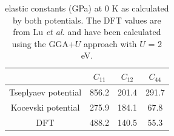 \documentclass[preprint, 12pt]{elsarticle}
\begin{document}
\begin{table}[h!]
    \centering
    \caption{ elastic constants (GPa) at 0 K as calculated by both potentials. The DFT values are from Lu \textit{et al.} \cite{Lu2011} and have been calculated using the GGA+$U$ approach with $U$ = 2 eV.}
    \footnotesize
    \begin{tabular}{c|ccc}
    \hline
                             & $C_{11}$ & $C_{12}$ & $C_{44}$ \\
    \hline          
    Tseplyaev potential    & 856.2    & 201.4    & 291.7    \\
    Kocevski potential     & 275.9    & 184.1    & 67.8     \\
    DFT \cite{Lu2011}        & 488.2    & 140.5    & 55.3     \\
    \hline
    \end{tabular}
    \label{Tab:ECUN2}
\end{table}
\end{document}
